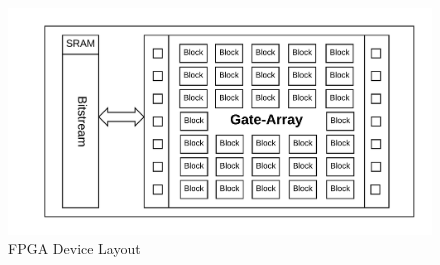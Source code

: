 \begin{figure}
\centering
\includegraphics[width=0.9\linewidth]{Figures/architecture}
\caption[FPGA Device Layout]{FPGA Device Layout}
\label{fig:architecture}
\end{figure}

